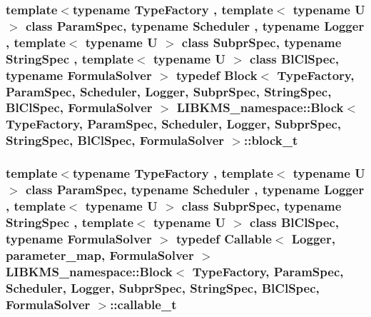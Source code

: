 \hypertarget{classLIBKMS__namespace_1_1Block_ae33d301121e149f8c7cc9a19f7046237}{
\subsubsection[{block\-\_\-t}]{\setlength{\rightskip}{0pt plus 5cm}template$<$typename Type\-Factory , template$<$ typename U $>$ class Param\-Spec, typename Scheduler , typename Logger , template$<$ typename U $>$ class Subpr\-Spec, typename String\-Spec , template$<$ typename U $>$ class Bl\-Cl\-Spec, typename Formula\-Solver $>$ typedef {\bf Block}$<$ {\bf Type\-Factory}, Param\-Spec, Scheduler, Logger, Subpr\-Spec, String\-Spec, Bl\-Cl\-Spec, Formula\-Solver $>$ {\bf L\-I\-B\-K\-M\-S\-\_\-namespace\-::\-Block}$<$ {\bf Type\-Factory}, Param\-Spec, Scheduler, Logger, Subpr\-Spec, String\-Spec, Bl\-Cl\-Spec, Formula\-Solver $>$\-::{\bf block\-\_\-t}}}\label{classLIBKMS__namespace_1_1Block_ae33d301121e149f8c7cc9a19f7046237}
\hypertarget{classLIBKMS__namespace_1_1Block_a3742cf8820e4b909e4fbcc3d9c22d686}{
\subsubsection[{callable\-\_\-t}]{\setlength{\rightskip}{0pt plus 5cm}template$<$typename Type\-Factory , template$<$ typename U $>$ class Param\-Spec, typename Scheduler , typename Logger , template$<$ typename U $>$ class Subpr\-Spec, typename String\-Spec , template$<$ typename U $>$ class Bl\-Cl\-Spec, typename Formula\-Solver $>$ typedef {\bf Callable}$<$ Logger, {\bf parameter\-\_\-map}, Formula\-Solver $>$ {\bf L\-I\-B\-K\-M\-S\-\_\-namespace\-::\-Block}$<$ {\bf Type\-Factory}, Param\-Spec, Scheduler, Logger, Subpr\-Spec, String\-Spec, Bl\-Cl\-Spec, Formula\-Solver $>$\-::{\bf callable\-\_\-t}}}\label{classLIBKMS__namespace_1_1Block_a3742cf8820e4b909e4fbcc3d9c22d686}
